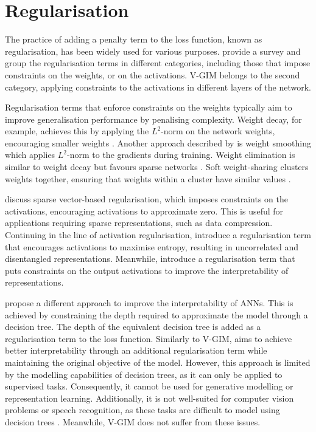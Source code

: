 	
	

\section{Regularisation}
	The practice of adding a penalty term to the loss function, known as regularisation, has been widely used for various purposes. \cite{kukackaRegularizationDeepLearning2017} provide a survey and group the regularisation terms in different categories, including those that impose constraints on the weights, or on the activations. V-GIM belongs to the second category, applying constraints to the activations in different layers of the network.
	
	Regularisation terms that enforce constraints on the weights typically aim to improve generalisation performance by penalising complexity. Weight decay, for example, achieves this by applying the $L^2$-norm on the network weights, encouraging smaller weights \citep{gneccoWeightdecayTechniqueLearning2009}. Another approach described by \cite{kukackaRegularizationDeepLearning2017} is weight smoothing which applies $L^2$-norm to the gradients during training. Weight elimination is similar to weight decay but favours sparse networks \citep{weigendGeneralizationWeightEliminationApplication1990}. Soft weight-sharing clusters weights together, ensuring that weights within a cluster have similar values \citep{nowlanSimplifyingNeuralNetworks1992}.
	
	\cite{tianComprehensiveSurveyRegularization2022} discuss sparse vector-based regularisation, which imposes constraints on the activations, encouraging activations to approximate zero. This is useful for applications requiring sparse representations, such as data compression. Continuing in the line of activation regularisation, \cite{tomczakLearningInformativeFeatures2016} introduce a regularisation term that encourages activations to maximise entropy, resulting in uncorrelated and disentangled representations. Meanwhile, \cite{wuImprovingInterpretabilityRegularization2018} introduce a regularisation term that puts constraints on the output activations to improve the interpretability of representations. 
	
	\cite{wuOptimizingInterpretabilityDeep2021} propose a different approach to improve the interpretability of ANNs. This is achieved by constraining the depth required to approximate the model through a decision tree. The depth of the equivalent decision tree is added as a regularisation term to the loss function. Similarly to V-GIM, \citeauthor{wuOptimizingInterpretabilityDeep2021} aims to achieve better interpretability through an additional regularisation term while maintaining the original objective of the model. However, this approach is limited by the modelling capabilities of decision trees, as it can only be applied to supervised tasks. Consequently, it cannot be used for generative modelling or representation learning. Additionally, it is not well-suited for computer vision problems or speech recognition, as these tasks are difficult to model using decision trees \citep{stanfordmedaiMedAI34Optimizing2022}. Meanwhile, V-GIM does not suffer from these issues.
	
